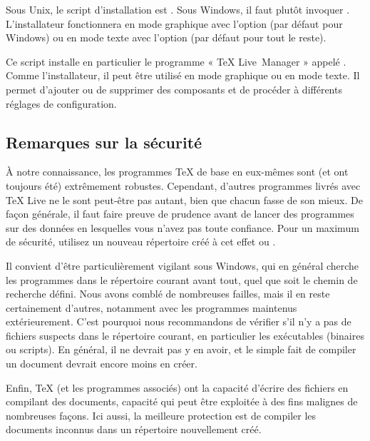 \documentclass[german, english, french, 12pt]{article}
\renewcommand{\TL}{\TeX{} Live\xspace}%
\begin{document}
\begin{itemize*}

\item Sous Unix, le script d'installation est .  Sous
  Windows, il faut plutôt invoquer .
  L'installateur fonctionnera en mode graphique avec l'option 
  (par défaut pour Windows) ou en mode texte avec l'option
   (par défaut pour tout le reste).

\item Ce script installe en particulier le programme « \TL\ Manager » appelé
  . Comme l'installateur, il peut être utilisé en mode graphique ou
  en mode texte. Il permet d'ajouter ou de supprimer des composants et de
  procéder à différents réglages de configuration.

\end{itemize*}

\subsection{Remarques sur la sécurité}
\label{sec:security}

À notre connaissance, les programmes \TeX{} de base en eux-mêmes sont (et ont
toujours été) extrêmement robustes. Cependant, d'autres programmes livrés avec
\TL{} ne le sont peut-être pas autant, bien que chacun fasse de son mieux. De
façon générale, il faut faire preuve de prudence avant de lancer des programmes
sur des données en lesquelles vous n'avez pas toute confiance. Pour un maximum
de sécurité, utilisez un nouveau répertoire créé à cet effet ou .

Il convient d'être particulièrement vigilant sous Windows, qui en général
cherche les programmes dans le répertoire courant avant tout, quel que soit le
chemin de recherche défini. Nous avons comblé de nombreuses failles, mais il en
reste certainement d'autres, notamment avec les programmes maintenus
extérieurement. C'est pourquoi nous recommandons de vérifier s'il n'y a pas de
fichiers suspects dans le répertoire courant, en particulier les exécutables
(binaires ou scripts). En général, il ne devrait pas y en avoir, et le simple
fait de compiler un document devrait encore moins en créer.

Enfin, \TeX{} (et les programmes associés) ont la capacité d'écrire des fichiers
en compilant des documents, capacité qui peut être exploitée à des fins malignes
de nombreuses façons. Ici aussi, la meilleure protection est de compiler les
documents inconnus dans un répertoire nouvellement créé.
\end{document}
